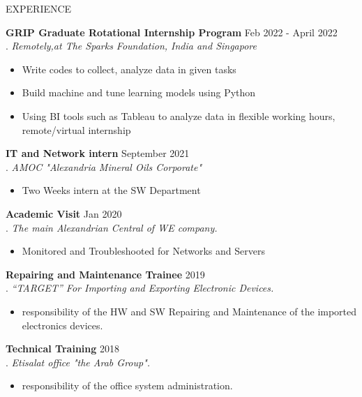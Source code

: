 \documentclass{resume} %
\begin{document}


 \begin{rSection}{EXPERIENCE}

 \textbf{GRIP Graduate Rotational Internship Program} \hfill  Feb 2022 - April 2022\\
  .	 \hfill \textit{Remotely,at The Sparks Foundation, India and Singapore}
  \begin{itemize}
     \itemsep -3pt {} 
      \item Write codes to collect, analyze data in given tasks
      \item Build machine and tune learning models using Python
      \item Using BI tools such as Tableau to analyze data in flexible working hours, remote/virtual internship
 \end{itemize}
 
 
  \textbf{IT and Network intern} \hfill   September 2021\\
 . \hfill \textit{AMOC "Alexandria Mineral Oils Corporate"}
  \begin{itemize}
     \itemsep -3pt {} 
      \item Two Weeks intern at the SW Department
 \end{itemize}
 
   \textbf{Academic Visit} \hfill   Jan 2020\\
. \hfill \textit{The main Alexandrian Central of WE company.}
  \begin{itemize}
     \itemsep -3pt {} 
      \item  Monitored and Troubleshooted for Networks and Servers
 \end{itemize}
 
    \textbf{Repairing and Maintenance Trainee} \hfill    2019\\
. \hfill \textit{“TARGET” For Importing and Exporting Electronic Devices.}
  \begin{itemize}
     \itemsep -3pt {} 
      \item  responsibility of the HW and SW Repairing and Maintenance of the imported electronics devices.
 \end{itemize}
 
     \textbf{Technical Training} \hfill   2018\\
. \hfill \textit{Etisalat office "the Arab Group".}
  \begin{itemize}
     \itemsep -3pt {} 
      \item  responsibility of the office system administration.
 \end{itemize}


\end{rSection}
\end{document}
